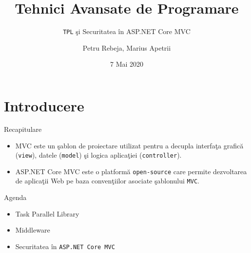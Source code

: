 \documentclass[presentation]{beamer}
\author{Petru Rebeja, Marius Apetrii}
\date{7 Mai 2020}
\title{Tehnici Avansate de Programare}
\subtitle{\texttt{TPL} şi Securitatea în ASP.NET Core MVC}
\institute[UAIC]{Facultatea de Matematică\\Universitatea Alexandru Ioan Cuza, Iași}
\begin{document}
\maketitle
\section{Introducere}
\label{sec:orgf7f8a69}
\begin{frame}[label={sec:org789930d},fragile]{Recapitulare}
 \pause
\begin{itemize}
\item \alert{MVC} este un şablon de proiectare utilizat pentru a decupla interfaţa grafică (\texttt{view}), datele (\texttt{model}) şi logica aplicaţiei (\texttt{controller}).
\end{itemize}
\pause
\begin{itemize}
\item \alert{ASP.NET Core MVC} este o platformă \texttt{open-source} care permite dezvoltarea de aplicaţii Web pe baza convenţiilor asociate şablonului \texttt{MVC}.
\end{itemize}
\end{frame}
\begin{frame}[label={sec:org7514620},fragile]{Agenda}
 \begin{itemize}
\item Task Parallel Library
\item Middleware
\item Securitatea în \texttt{ASP.NET Core MVC}
\end{itemize}
\end{frame}
\end{document}
